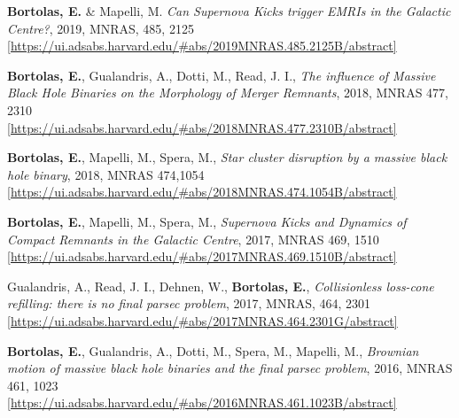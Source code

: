 \documentclass[11pt,a4paper]{article}
\begin{document}
\begin{etaremune}

\item {\bf Bortolas, E.} \& Mapelli, M. { \it Can Supernova Kicks trigger EMRIs in the Galactic Centre?}, 2019, MNRAS, 485, 2125 \\ \href{https://ui.adsabs.harvard.edu/#abs/2019MNRAS.485.2125B/abstract}{\scriptsize [https://ui.adsabs.harvard.edu/\#abs/2019MNRAS.485.2125B/abstract]}

\item {\bf Bortolas, E.}, Gualandris, A., Dotti, M., Read, J. I., { \it The influence of Massive Black Hole Binaries on the Morphology of Merger Remnants},  2018, MNRAS 477, 2310 \\ \href{https://ui.adsabs.harvard.edu/#abs/2018MNRAS.477.2310B/abstract}{\scriptsize [https://ui.adsabs.harvard.edu/\#abs/2018MNRAS.477.2310B/abstract]}

\item {\bf Bortolas, E.}, Mapelli, M., Spera, M., { \it Star cluster disruption by a massive black hole binary}, 2018, MNRAS 474,1054 \\ \href{https://ui.adsabs.harvard.edu/#abs/2018MNRAS.474.1054B/abstract}{\scriptsize [https://ui.adsabs.harvard.edu/\#abs/2018MNRAS.474.1054B/abstract]}

\item {\bf Bortolas, E.}, Mapelli, M., Spera, M., {\it Supernova Kicks and Dynamics of Compact Remnants in the Galactic Centre}, 2017, MNRAS 469, 1510 \\ \href{https://ui.adsabs.harvard.edu/#abs/2017MNRAS.469.1510B/abstract}{\scriptsize [https://ui.adsabs.harvard.edu/#abs/2017MNRAS.469.1510B/abstract]} 

\item Gualandris, A., Read, J. I., Dehnen, W., {\bf Bortolas, E.}, {\it Collisionless loss-cone refilling: there is no final parsec problem}, 2017, MNRAS, 464, 2301 
\\ \href{https://ui.adsabs.harvard.edu/#abs/2017MNRAS.464.2301G/abstract}{\scriptsize [https://ui.adsabs.harvard.edu/\#abs/2017MNRAS.464.2301G/abstract]}


\item {\bf Bortolas, E.}, Gualandris, A., Dotti, M., Spera, M., Mapelli, M., {\it Brownian motion of massive black hole binaries and the final parsec problem}, 2016, MNRAS 461, 1023 \\ \href{https://ui.adsabs.harvard.edu/#abs/2016MNRAS.461.1023B/abstract}{\scriptsize [https://ui.adsabs.harvard.edu/\#abs/2016MNRAS.461.1023B/abstract]}


\end{etaremune}
\end{document}
